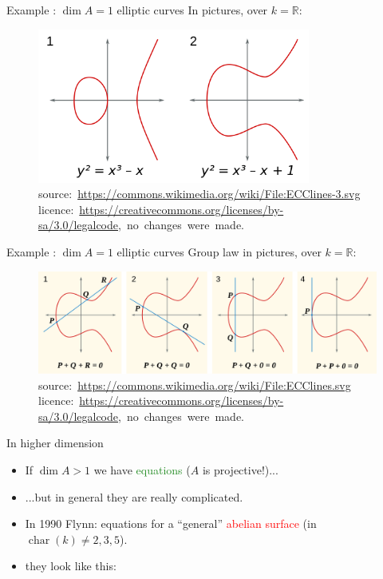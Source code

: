 \documentclass[usenames,dvipsnames]{beamer}
\def\R{\mathbb{R}}
\DeclareMathOperator{\Char}{char}
\newcommand{\red}[1]{\textcolor{red}{#1}}
\newcommand{\green}[1]{\textcolor{ForestGreen}{#1}}
\begin{document}
\begin{frame}{ Example : $\dim A=1$ elliptic curves }
In pictures, over $k=\R$:
\begin{figure}[h]
\centering
\includegraphics[width=0.8\textwidth]{fig_ec_examples.png}
\mbox{\tiny source: \url{https://commons.wikimedia.org/wiki/File:ECClines-3.svg}}
\mbox{\tiny licence: \url{https://creativecommons.org/licenses/by-sa/3.0/legalcode}, no changes were made.}
\end{figure}
\end{frame}

\begin{frame}{ Example : $\dim A=1$ elliptic curves }
Group law in pictures, over $k=\R$:
\begin{figure}[h]
\label{fig:add_law}
\centering
\includegraphics[width=\textwidth]{fig_ec_group_law.png}
\mbox{\tiny source: \url{https://commons.wikimedia.org/wiki/File:ECClines.svg}}
\mbox{\tiny licence: \url{https://creativecommons.org/licenses/by-sa/3.0/legalcode}, no changes were made.}
\end{figure}
\end{frame}

\begin{frame}{ In higher dimension }
\begin{itemize}\setlength\itemsep{1em}
	\item If $\dim A >1$ we have \green{equations} ($A$ is projective!)...
	\pause \item ...but in general they are really complicated.
	\pause \item In 1990 Flynn: equations for a ``general'' \red{abelian surface} (in $\Char(k) \neq 2,3,5$).

	\pause \item they look like this:
\end{itemize}
\end{frame}
\end{document}
